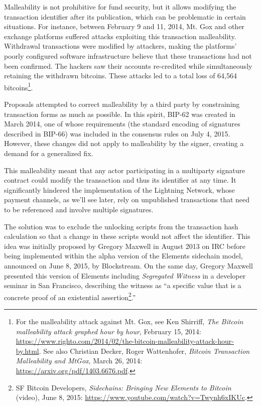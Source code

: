 \documentclass[
  a5paper,
  smalldemyvopaper,10pt,twoside,onecolumn,openright,extrafontsizes,hidelinks]{memoir}
\begin{document}
Malleability is not prohibitive for fund security, but it allows
modifying the transaction identifier after its publication, which can be
problematic in certain situations. For instance, between February 9 and
11, 2014, Mt. Gox and other exchange platforms suffered attacks
exploiting this transaction malleability. Withdrawal transactions were
modified by attackers, making the platforms' poorly configured software
infrastructure believe that these transactions had not been confirmed.
The hackers saw their accounts re-credited while simultaneously
retaining the withdrawn bitcoins. These attacks led to a total loss of
64,564 bitcoins\footnote{For the malleability attack against Mt. Gox,
  see Ken Shirriff, \emph{The Bitcoin malleability attack graphed hour
  by hour}, February 15, 2014:
  \url{https://www.righto.com/2014/02/the-bitcoin-malleability-attack-hour-by.html}.
  See also Christian Decker, Roger Wattenhofer, \emph{Bitcoin
  Transaction Malleability and MtGox}, March 26, 2014:
  \url{https://arxiv.org/pdf/1403.6676.pdf}.}.

Proposals attempted to correct malleability by a third party by
constraining transaction forms as much as possible. In this spirit,
BIP-62 was created in March 2014, one of whose requirements (the
standard encoding of signatures described in BIP-66) was included in the
consensus rules on July 4, 2015. However, these changes did not apply to
malleability by the signer, creating a demand for a generalized fix.

This malleability meant that any actor participating in a multiparty
signature contract could modify the transaction and thus its identifier
at any time. It significantly hindered the implementation of the
Lightning Network, whose payment channels, as we'll see later, rely on
unpublished transactions that need to be referenced and involve multiple
signatures.

The solution was to exclude the unlocking scripts from the transaction
hash calculation so that a change in these scripts would not affect the
identifier. This idea was initially proposed by Gregory Maxwell in
August 2013 on IRC before being implemented within the alpha version of
the Elements sidechain model, announced on June 8, 2015, by Blockstream.
On the same day, Gregory Maxwell presented this version of Elements
including \emph{Segregated Witness} in a developer seminar in San
Francisco, describing the witness as ``a specific value that is a
concrete proof of an existential assertion\footnote{SF Bitcoin
  Developers, \emph{Sidechains: Bringing New Elements to Bitcoin}
  (video), June 8, 2015:
  \url{https://www.youtube.com/watch?v=Twynh6xIKUc}.}.''
\end{document}
